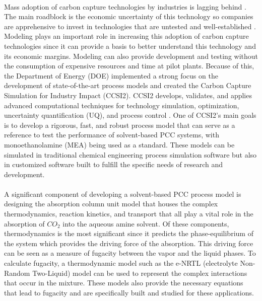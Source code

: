 \documentclass[12pt, letterpaper]{article}
\begin{document}
\paragraph{}
Mass adoption of carbon capture technologies by industries is lagging behind \cite{Ma2022}.  The main roadblock is the economic uncertainty of this technology so companies are apprehensive to invest in technologies that are untested and well-established \cite{Ma2022}. Modeling plays an important role in increasing this adoption of carbon capture technologies since it can provide a basis to better understand this technology and its economic margins.  Modeling can also provide development and testing without the consumption of expensive resources and time at pilot plants. Because of this, the Department of Energy (DOE) implemented a strong focus on the development of state-of-the-art process models and created the Carbon Capture Simulation for Industry Impact (CCSI2). CCSI2 develops, validates, and applies advanced computational techniques for technology simulation, optimization, uncertainty quantification (UQ), and process control \cite{NETLwebsite}. One of CCSI2's main goals is to develop  a rigorous, fast, and robust process model that can serve as a reference to test the performance of solvent-based PCC systems, with monoethanolamine (MEA) being used as a standard. These models can be simulated in traditional chemical engineering process simulation software but also in customized software built to fulfill the specific needs of research and development.

\paragraph{}
A significant component of developing a solvent-based PCC process model is designing the absorption column unit model that houses the complex thermodynamics, reaction kinetics, and transport that all play a vital role in the absorption of $CO_2$ into the aqueous amine solvent. Of these components, thermodynamics is the most significant since it predicts the phase-equilibrium of the system which provides the driving force of the absorption. This driving force can be seen as a measure of fugacity between the vapor and the liquid phases. To calculate fugacity, a thermodynamic model such as the e-NRTL (electrolyte Non-Random Two-Liquid) model can be used to represent the complex interactions that occur in the mixture. These models also provide the necessary equations that lead to fugacity and are specifically built and studied for these applications.
\end{document}
